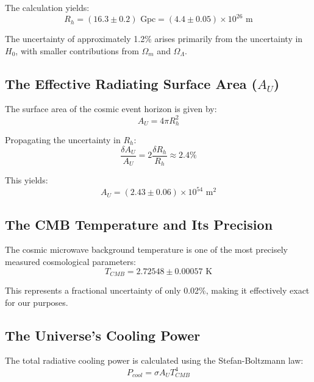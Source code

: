 \documentclass[11pt,a4paper]{article}
\theoremstyle{definition}
\theoremstyle{remark}
\begin{document}
The calculation yields:
\begin{equation}
    R_h = (16.3 \pm 0.2) \text{ Gpc} = (4.4 \pm 0.05) \times 10^{26} \text{ m}
\end{equation}

The uncertainty of approximately 1.2\% arises primarily from the uncertainty in \(H_0\), with smaller contributions from \(\Omega_m\) and \(\Omega_\Lambda\).

\subsection{The Effective Radiating Surface Area (\(A_U\))}

The surface area of the cosmic event horizon is given by:
\begin{equation}
    A_U = 4\pi R_h^2
\end{equation}

Propagating the uncertainty in \(R_h\):
\begin{equation}
    \frac{\delta A_U}{A_U} = 2 \frac{\delta R_h}{R_h} \approx 2.4\%
\end{equation}

This yields:
\begin{equation}
    A_U = (2.43 \pm 0.06) \times 10^{54} \text{ m}^2
\end{equation}

\subsection{The CMB Temperature and Its Precision}

The cosmic microwave background temperature is one of the most precisely measured cosmological parameters:
\begin{equation}
    T_{CMB} = 2.72548 \pm 0.00057 \text{ K}
\end{equation}

This represents a fractional uncertainty of only 0.02\%, making it effectively exact for our purposes.

\subsection{The Universe's Cooling Power}

The total radiative cooling power is calculated using the Stefan-Boltzmann law:
\begin{equation}
    P_{cool} = \sigma A_U T_{CMB}^4
\end{equation}
\end{document}
